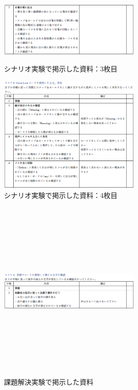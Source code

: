 \documentclass[11pt,a4j, titlepage]{jarticle} %
\begin{document}
\begin{figure}[htbp]
 \begin{minipage}{0.5\hsize}
  \begin{center}
   \includegraphics[width=70mm]{task2_2.eps}
  \end{center}
  \caption{シナリオ実験で掲示した資料：3枚目}
  \label{fig:task2_2}
 \end{minipage}
 \begin{minipage}{0.5\hsize}
  \begin{center}
   \includegraphics[width=70mm]{task3.eps}
  \end{center}
  \caption{シナリオ実験で掲示した資料：4枚目}
  \label{fig:task3}
 \end{minipage}
\end{figure}

\begin{figure}[H]
  \begin{center}
    \includegraphics[clip,height=9.0cm,width=7.0cm]{./task4.eps}
    \caption{課題解決実験で掲示した資料}
    \label{fig:task4}
  \end{center}
\end{figure}
\end{document}
